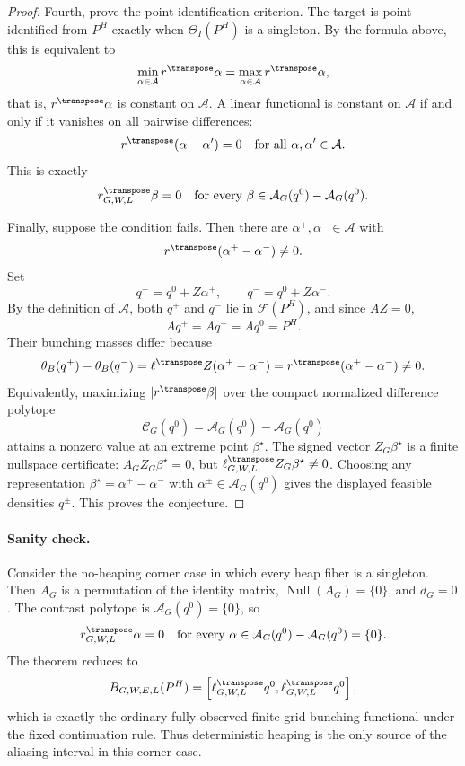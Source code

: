 \begin{proof}
Fourth, prove the point-identification criterion.  The target is point identified from \(P^H\) exactly when \(\Theta_I(P^H)\) is a singleton.  By the formula above, this is equivalent to
\[
\min_{\alpha\in\mathcal{A}}r^{\transpose}\alpha
=
\max_{\alpha\in\mathcal{A}}r^{\transpose}\alpha,
\]
that is, \(r^{\transpose}\alpha\) is constant on \(\mathcal{A}\).  A linear functional is constant on \(\mathcal{A}\) if and only if it vanishes on all pairwise differences:
\[
r^{\transpose}(\alpha-\alpha')=0
\quad\text{for all }\alpha,\alpha'\in\mathcal{A}.
\]
This is exactly
\[
r_{G,W,L}^{\transpose}\beta=0
\quad\text{for every }\beta\in\mathcal{A}_G(q^0)-\mathcal{A}_G(q^0).
\]

Finally, suppose the condition fails.  Then there are \(\alpha^+,\alpha^-\in\mathcal{A}\) with
\[
r^{\transpose}(\alpha^+-\alpha^-)\ne 0.
\]
Set
\[
q^+=q^0+Z\alpha^+,\qquad q^-=q^0+Z\alpha^-.
\]
By the definition of \(\mathcal{A}\), both \(q^+\) and \(q^-\) lie in \(\mathcal{F}(P^H)\), and since \(AZ=0\),
\[
Aq^+=Aq^-=Aq^0=P^H.
\]
Their bunching masses differ because
\[
\theta_B(q^+)-\theta_B(q^-)
=\ell^{\transpose}Z(\alpha^+-\alpha^-)
=r^{\transpose}(\alpha^+-\alpha^-)
\ne0.
\]
Equivalently, maximizing \(|r^{\transpose}\beta|\) over the compact normalized difference polytope
\[
\mathcal{C}_G(q^0)=\mathcal{A}_G(q^0)-\mathcal{A}_G(q^0)
\]
attains a nonzero value at an extreme point \(\beta^\star\).  The signed vector \(Z_G\beta^\star\) is a finite nullspace certificate: \(A_GZ_G\beta^\star=0\), but \(\ell_{G,W,L}^{\transpose}Z_G\beta^\star\ne0\).  Choosing any representation \(\beta^\star=\alpha^+-\alpha^-\) with \(\alpha^\pm\in\mathcal{A}_G(q^0)\) gives the displayed feasible densities \(q^\pm\).  This proves the conjecture.
\end{proof}

\paragraph{Sanity check.}
Consider the no-heaping corner case in which every heap fiber is a singleton.  Then \(A_G\) is a permutation of the identity matrix, \(\operatorname{Null}(A_G)=\{0\}\), and \(d_G=0\).  The contrast polytope is \(\mathcal{A}_G(q^0)=\{0\}\), so
\[
r_{G,W,L}^{\transpose}\alpha=0
\quad\text{for every }\alpha\in\mathcal{A}_G(q^0)-\mathcal{A}_G(q^0)=\{0\}.
\]
The theorem reduces to
\[
B_{G,W,E,L}(P^H)=\left[\ell_{G,W,L}^{\transpose}q^0,\ell_{G,W,L}^{\transpose}q^0\right],
\]
which is exactly the ordinary fully observed finite-grid bunching functional under the fixed continuation rule.  Thus deterministic heaping is the only source of the aliasing interval in this corner case.


